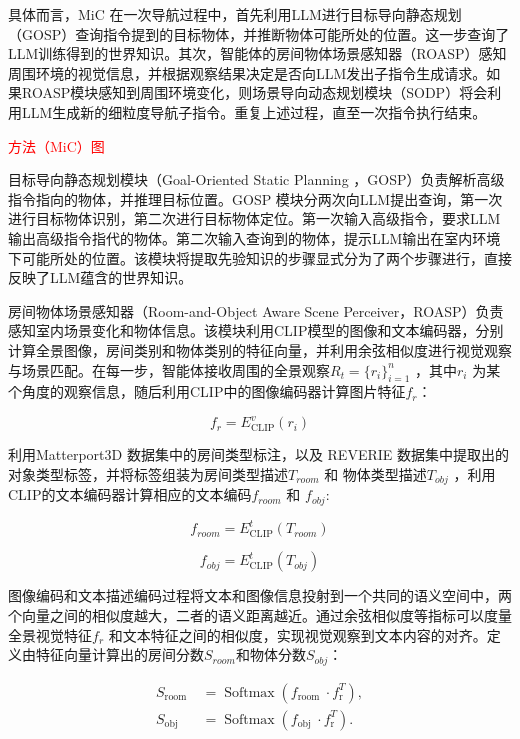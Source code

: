 \documentclass[bachelor]{thesis-uestc}
\begin{document}
具体而言，MiC 在一次导航过程中，首先利用LLM进行目标导向静态规划（GOSP）查询指令提到的目标物体，并推断物体可能所处的位置。这一步查询了LLM训练得到的世界知识。其次，智能体的房间物体场景感知器（ROASP）感知周围环境的视觉信息，并根据观察结果决定是否向LLM发出子指令生成请求。如果ROASP模块感知到周围环境变化，则场景导向动态规划模块（SODP）将会利用LLM生成新的细粒度导航子指令。重复上述过程，直至一次指令执行结束。

\textcolor{red}{方法（MiC）图}

目标导向静态规划模块（Goal-Oriented Static Planning ，GOSP）负责解析高级指令指向的物体，并推理目标位置。GOSP 模块分两次向LLM提出查询，第一次进行目标物体识别，第二次进行目标物体定位。第一次输入高级指令，要求LLM输出高级指令指代的物体。第二次输入查询到的物体，提示LLM输出在室内环境下可能所处的位置。该模块将提取先验知识的步骤显式分为了两个步骤进行，直接反映了LLM蕴含的世界知识。

房间物体场景感知器（Room-and-Object Aware Scene Perceiver，ROASP）负责感知室内场景变化和物体信息。该模块利用CLIP模型的图像和文本编码器，分别计算全景图像，房间类别和物体类别的特征向量，并利用余弦相似度进行视觉观察与场景匹配。在每一步，智能体接收周围的全景观察$R_t = \{r_i\}_{i=1}^n$ ，其中$r_i$ 为某个角度的观察信息，随后利用CLIP中的图像编码器计算图片特征$f_r$：

\begin{equation}
    f_r = E^{v}_{\text{CLIP}}(r_i)
\label{fr}
\end{equation}

利用Matterport3D 数据集中的房间类型标注，以及 REVERIE 数据集中提取出的对象类型标签，并将标签组装为房间类型描述$T_{room}$ 和 物体类型描述$T_{obj}$ ，利用CLIP的文本编码器计算相应的文本编码$f_{room}$ 和 $f_{obj}$:

\begin{equation}
    f_{room} = E^{t}_{\text{CLIP}}(T_{room})
\label{froom}
\end{equation}

\begin{equation}
    f_{obj} = E^{t}_{\text{CLIP}}(T_{obj})
\label{fobj}
\end{equation}

图像编码和文本描述编码过程将文本和图像信息投射到一个共同的语义空间中，两个向量之间的相似度越大，二者的语义距离越近。通过余弦相似度等指标可以度量全景视觉特征$f_r$ 和文本特征之间的相似度，实现视觉观察到文本内容的对齐。定义由特征向量计算出的房间分数$S_{room}$和物体分数$S_{obj}$：

\begin{equation}
    \begin{aligned}
        S_{\text {room }} & =\operatorname{Softmax}\left(f_{\text {room }} \cdot f_{\mathrm{r}}^{T}\right), \\
        S_{\text {obj }} & =\operatorname{Softmax}\left(f_{\text {obj }} \cdot f_{\mathrm{r}}^{T}\right) .
        \end{aligned}
\label{s}
\end{equation}
\end{document}
